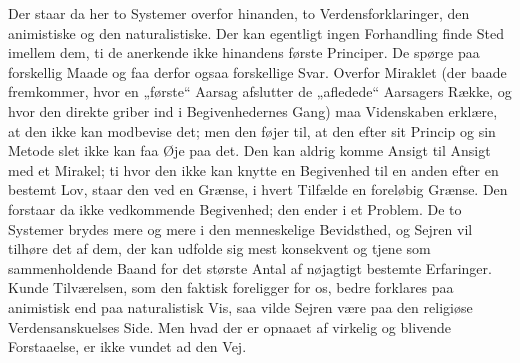 \documentclass[12pt,a4paper]{article}
\begin{document}
Der staar da her to Systemer overfor hinanden, to Verdensforklaringer, den
animistiske og den naturalistiske. Der kan egentligt ingen Forhandling finde
Sted imellem dem, ti de anerkende ikke hinandens første Principer. De spørge
paa forskellig Maade og faa derfor ogsaa forskellige Svar. Overfor Miraklet
(der baade fremkommer, hvor en „første“ Aarsag afslutter de „afledede“
Aarsagers Række, og hvor den direkte griber ind i Begivenhedernes Gang) maa
Videnskaben erklære, at den ikke kan modbevise det; men den føjer til, at
den efter sit Princip og sin Metode slet ikke kan faa Øje paa det. Den kan
aldrig komme Ansigt til Ansigt med et Mirakel; ti hvor den ikke kan knytte
en Begivenhed til en anden efter en bestemt Lov, staar den ved en Grænse, i
hvert Tilfælde en foreløbig Grænse. Den forstaar da ikke vedkommende
Begivenhed; den ender i et Problem. De to Systemer brydes mere og mere i den
menneskelige Bevidsthed, og Sejren vil tilhøre det af dem, der kan udfolde
sig mest konsekvent og tjene som sammenholdende Baand for det største Antal
af nøjagtigt bestemte Erfaringer. Kunde Tilværelsen, som den faktisk
foreligger for os, bedre forklares paa animistisk end paa naturalistisk Vis,
saa vilde Sejren være paa den religiøse Verdensanskuelses Side. Men hvad der
er opnaaet af virkelig og blivende Forstaaelse, er ikke vundet ad den Vej.
\end{document}
